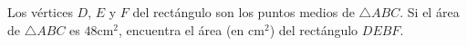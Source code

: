 Los vértices $D$, $E$ y $F$ del rectángulo son los puntos medios de $\triangle ABC$. Si el área de $\triangle ABC$ es $48\text{cm}^2$, encuentra el área (en $\text{cm}^2$) del rectángulo $DEBF$.
